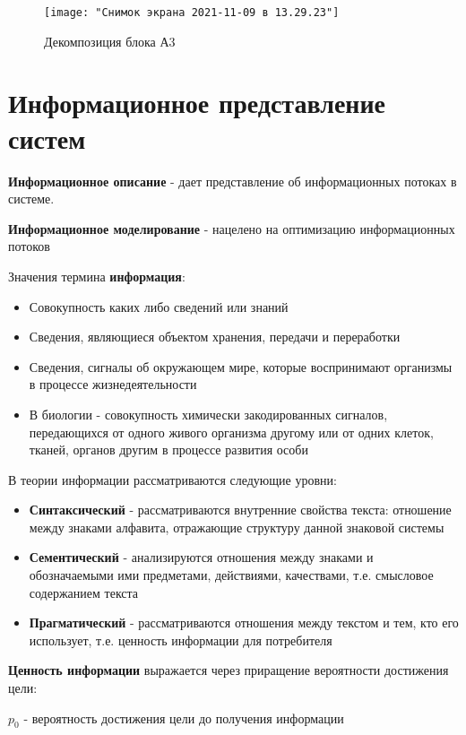 \documentclass[a4paper]{article}
\begin{document}
	\begin{figure}[h!]
		\centering
		\texttt{[image: "Снимок экрана 2021-11-09 в 13.29.23"]}
		\caption{Декомпозиция блока А3}
		\label{fig:--2021-11-09--13}
	\end{figure}
	
	\newpage
	
	\section{Информационное представление систем}
	
	\textbf{Информационное описание} - дает представление об информационных потоках в системе.
	
	\textbf{Информационное моделирование} - нацелено на оптимизацию информационных потоков
	
	Значения термина \textbf{информация}:
	\begin{itemize}
		\item Совокупность каких либо сведений или знаний
		\item Сведения, являющиеся объектом хранения, передачи и переработки
		\item Сведения, сигналы об окружающем мире, которые воспринимают организмы в процессе жизнедеятельности
		\item В биологии - совокупность химически закодированных сигналов, передающихся от одного живого организма другому или от одних клеток, тканей, органов другим в процессе развития особи
	\end{itemize}

	В теории информации рассматриваются следующие уровни:
		\begin{itemize}
		\item \textbf{Синтаксический} - рассматриваются внутренние свойства текста: отношение между знаками алфавита, отражающие структуру данной знаковой системы
		\item \textbf{Сементический} - анализируются отношения между знаками и обозначаемыми ими предметами, действиями, качествами, т.е. смысловое содержанием текста
		\item \textbf{Прагматический} - рассматриваются отношения между текстом и тем, кто его использует, т.е. ценность информации для потребителя
	\end{itemize}

	\textbf{Ценность информации} выражается через приращение вероятности достижения цели:
	
	$ p_0 $ - вероятность достижения цели до получения информации
	
\end{document}
